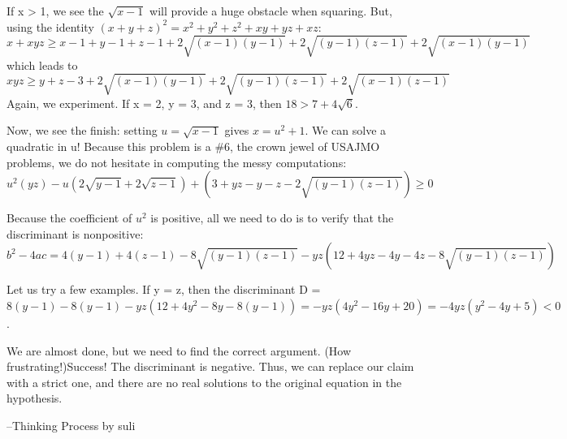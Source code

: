 \begin{enumerate}
 If x > 1, we see the $\sqrt{x - 1}$ will provide a huge obstacle when squaring. But, using the identity $(x+y+z)^2 = x^2 + y^2 + z^2 + xy + yz + xz$:
 \[x + xyz \ge x - 1 + y - 1 + z - 1 + 2\sqrt{(x-1)(y-1)} + 2\sqrt{(y-1)(z-1)} + 2\sqrt{(x-1)(y-1)}\]which leads to
 \[xyz \ge y + z - 3 + 2\sqrt{(x-1)(y-1)} + 2\sqrt{(y-1)(z-1)} + 2\sqrt{(x-1)(z-1)}\]Again, we experiment. If x = 2, y = 3, and z = 3, then $18 > 7 + 4\sqrt{6}$.

 Now, we see the finish: setting $u = \sqrt{x-1}$ gives $x = u^2 + 1$. We can solve a quadratic in u! Because this problem is a \#6, the crown jewel of USAJMO problems, we do not hesitate in computing the messy computations:
 \[u^2(yz) - u(2\sqrt{y-1} + 2\sqrt{z-1}) + (3 + yz - y - z - 2\sqrt{(y-1)(z-1)}) \ge 0\]

 Because the coefficient of $u^2$ is positive, all we need to do is to verify that the discriminant is nonpositive:
 \[b^2 - 4ac = 4(y-1) + 4(z-1) - 8\sqrt{(y-1)(z-1)} - yz(12 + 4yz - 4y - 4z - 8\sqrt{(y-1)(z-1)})\]

 Let us try a few examples. If y = z, then the discriminant D = $8(y-1) - 8(y-1) - yz(12 + 4y^2 - 8y - 8(y-1)) = -yz(4y^2 - 16y + 20) = -4yz(y^2 - 4y + 5) < 0$.

 We are almost done, but we need to find the correct argument. (How frustrating!)Success! The discriminant is negative. Thus, we can replace our claim with a strict one, and there are no real solutions to the original equation in the hypothesis.

 --Thinking Process by suli

 


\end{enumerate}